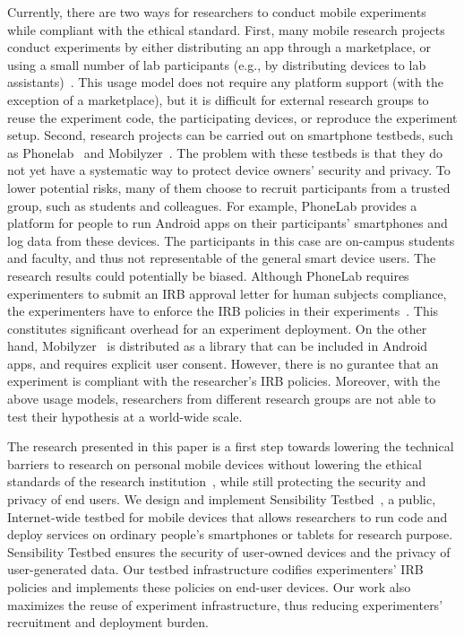 Currently, there are two ways for researchers to conduct mobile 
experiments while compliant with the ethical standard. 
First, many mobile research projects conduct experiments 
by either distributing an app through a marketplace, or using a 
small number of lab participants (e.g., by distributing devices to 
lab assistants)~\cite{hao2013isleep, wang2012no, 
wang2013sensing}. This usage model does not require any 
platform support (with the exception of a marketplace), but it 
is difficult for external research groups to reuse the experiment 
code, the participating devices, or reproduce the experiment 
setup. Second, research projects can be carried out on 
smartphone testbeds, such as Phonelab~\cite{phonelab, 
nandugudi2013phonelab} and 
Mobilyzer~\cite{nikravesh2015mobilyzer}. 
The problem with these testbeds is that they do not yet 
have a systematic way to protect device owners' security and 
privacy. To lower potential risks, many of them choose to 
recruit participants from a trusted group, such as students and 
colleagues. For example, PhoneLab provides a platform for 
people to run Android apps on their participants' smartphones 
and log data from these devices. %
The participants in this case are on-campus students and faculty, 
and thus not representable of the general smart device users. 
The research results could potentially 
be biased. Although PhoneLab requires experimenters to 
submit an IRB approval letter for human subjects compliance, 
the experimenters have to enforce the IRB policies in their 
experiments~\cite{nandugudi2013phonelab}. This constitutes
significant overhead for an experiment deployment. On the other 
hand, Mobilyzer~\cite{nikravesh2015mobilyzer} is distributed 
as a library that can be included in Android apps, and requires 
explicit user consent. However, there is no gurantee that an 
experiment is compliant with the researcher's IRB policies.
Moreover, with the above usage models, researchers from 
different research groups are not able to test their hypothesis 
at a world-wide scale. 
					
The research presented in this paper is a first step towards lowering the technical
barriers to research on personal mobile devices without lowering the
ethical standards of the research institution~\cite{zevenbergen2013ethical}, while still 
protecting the security and privacy of end users. We design and implement 
Sensibility Testbed~\cite{sensibility, zhuang2014sensibility}, a 
public, Internet-wide testbed for mobile devices that
allows researchers to run code and deploy services on ordinary
people's smartphones or tablets for research purpose. Sensibility Testbed ensures
the security of user-owned devices and the privacy of
user-generated data. Our testbed 
infrastructure codifies experimenters' IRB policies and 
implements these policies on end-user devices. Our work also 
maximizes the reuse of experiment infrastructure, thus reducing 
experimenters' recruitment and deployment burden. 

